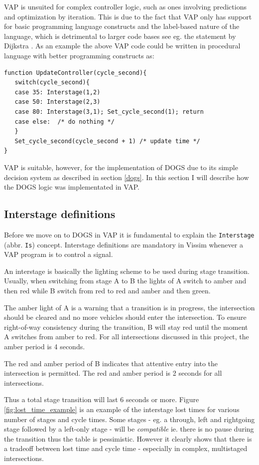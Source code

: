 VAP is unsuited for complex controller logic, such as ones involving predictions and optimization by iteration. This is due to the fact that VAP only has support for basic programming language constructs and the label-based nature of the language, which is detrimental to larger code bases see eg. the statement by Dijkstra \cite{nogoto}. As an example the above VAP code could be written in procedural language with better programming constructs as:

\begin{verbatim}
function UpdateController(cycle_second){
   switch(cycle_second){
   case 35: Interstage(1,2)
   case 50: Interstage(2,3)
   case 80: Interstage(3,1); Set_cycle_second(1); return
   case else:  /* do nothing */
   }
   Set_cycle_second(cycle_second + 1) /* update time */
}
\end{verbatim}

VAP is suitable, however, for the implementation of DOGS due to its simple decision system as described in section \ref{dogs}. In this section I will describe how the DOGS logic was implementated in VAP.

\subsection{Interstage definitions}
Before we move on to DOGS in VAP it is fundamental to explain the \verb|Interstage| (abbr. \verb|Is|) concept. Interstage definitions are mandatory in Vissim whenever a VAP program is to control a signal.

An interstage is basically the lighting scheme to be used during stage transition. Usually, when switching from stage A to B the lights of A switch to amber and then red while B switch from red to red and amber and then green.

The amber light of A is a warning that a transition is in progress, the intersection should be cleared and no more vehicles should enter the intersection. To ensure right-of-way consistency during the transition, B will stay red until the moment A switches from amber to red. For all intersections discussed in this project, the amber period is 4 seconds.

The red and amber period of B indicates that attentive entry into the intersection is permitted. The red and amber period is 2 seconds for all intersections.

Thus a total stage transition will last 6 seconds or more. Figure \ref{fig:lost_time_example} is an example of the interstage lost times for various number of stages and cycle times. Some stages - eg. a through, left and rightgoing stage followed by a left-only stage - will be \textit{compatible} ie. there is no pause during the transition thus the table is pessimistic. However it clearly shows that there is a tradeoff between lost time and cycle time - especially in complex, multistaged intersections.

